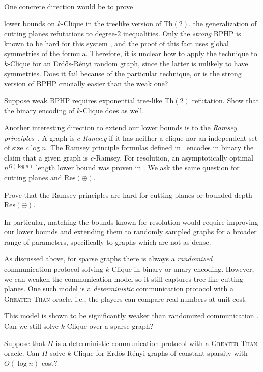 \documentclass[10pt,a4paper]{article}
\theoremstyle{definition}
\theoremstyle{remark}
\theoremstyle{example}
\theoremstyle{plain}
\newcommand{\Th}{\mathrm{Th}}
\newcommand{\ResLin}{\textrm{Res}(\oplus)}
\newcommand{\kClique}{$k$-\textsf{Clique}\xspace}
\providecommand{\erdosrenyi}{Erd\H{o}s-R\'{e}nyi\xspace}
\begin{document}
One concrete direction 
would be to prove 

lower
bounds on \kClique in the treelike version of $\Th(2)$, the generalization of cutting planes refutations to degree-$2$ inequalities. 
Only the \emph{strong} BPHP is known to be hard for this system \cite{IR21}, and the proof of this fact uses global symmetries of the formula. Therefore, it is unclear how to apply the technique to \kClique for an \erdosrenyi random graph, since the latter is unlikely to have symmetries. 
Does it fail because of the particular technique, or is the strong version of BPHP crucially easier than the weak one? 
\begin{problem}
    Suppose weak BPHP requires exponential tree-like $\Th(2)$ refutation. Show that the binary encoding of $k$-\textsf{Clique} does as well. 
\end{problem}
Another interesting direction to extend our lower bounds is to the \emph{Ramsey principles}~\cite{LPRT17ComplexityRamsey}.  
A graph is \emph{$c$-Ramsey} if it has neither a clique nor an independent set of size $c\log n$. 
The Ramsey principle formulas defined in~\cite{LPRT17ComplexityRamsey} encodes in binary
the claim that a given graph is $c$-Ramsey. For resolution, an asymptotically optimal $n^{\Omega (\log n)}$ length lower bound was proven in \cite{LPRT17ComplexityRamsey}.
We ask the same question for cutting planes and $\ResLin$.
\begin{problem}
    Prove that the Ramsey principles are hard for cutting planes or bounded-depth $\ResLin$.
\end{problem}
In particular, matching the bounds
known for resolution would require 
improving our lower bounds and 
extending them to randomly sampled graphs for a broader range of parameters,
specifically to graphs which are not as dense.

As discussed above, for sparse graphs there is always a \emph{randomized} communication protocol solving \kClique in binary or unary encoding. However, we can weaken the communication model so it still captures tree-like cutting planes. One such model is a \emph{deterministic} communication protocol with a \textsc{Greater Than} oracle, i.e., the players can compare real numbers at unit cost. 

This model is shown to be significantly weaker than randomized communication \cite{CLV19,CHHNPS25,GoosHR25}. Can we still solve \kClique over a sparse graph?
\begin{problem}
    Suppose that $\Pi$ is a deterministic communication protocol with a \textsc{Greater Than} oracle. Can $\Pi$ solve \kClique for \erdosrenyi graphs of constant sparsity with $O(\log n)$ cost?
\end{problem}
\end{document}
